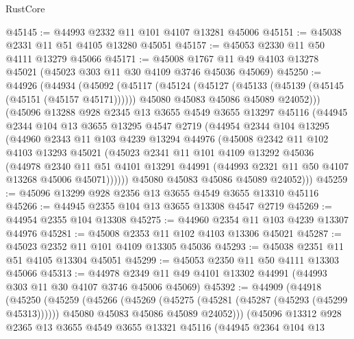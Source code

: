 \begin{lexlean}{RustCore}
\begin{coremodule}
@45145 := @44993 @2332 @11 @101 @4107 @13281 @45006
@45151 := @45038 @2331 @11 @51 @4105 @13280 @45051
@45157 := @45053 @2330 @11 @50 @4111 @13279 @45066
@45171 := @45008 @1767 @11 @49 @4103 @13278 @45021 (@45023 @303 @11 @30 @4109 @3746 @45036 @45069)
@45250 := @44926
    (@44934
      (@45092
        (@45117
          (@45124
            (@45127 (@45133 (@45139 (@45145 (@45151 (@45157 @45171))))))
            @45080
            @45083
            @45086
            @45089
            @24052)))
      (@45096
        @13288
        @928
        @2345
        @13
        @3655
        @4549
        @3655
        @13297
        @45116
        (@44945
          @2344
          @104
          @13
          @3655
          @13295
          @4547
          @2719
          (@44954
            @2344
            @104
            @13295
            (@44960
              @2343
              @11
              @103
              @4239
              @13294
              @44976
              (@45008
                @2342
                @11
                @102
                @4103
                @13293
                @45021
                (@45023
                  @2341
                  @11
                  @101
                  @4109
                  @13292
                  @45036
                  (@44978
                    @2340
                    @11
                    @51
                    @4101
                    @13291
                    @44991
                    (@44993 @2321 @11 @50 @4107 @13268 @45006 @45071))))))
          @45080
          @45083
          @45086
          @45089
          @24052)))
@45259 := @45096 @13299 @928 @2356 @13 @3655 @4549 @3655 @13310 @45116
@45266 := @44945 @2355 @104 @13 @3655 @13308 @4547 @2719
@45269 := @44954 @2355 @104 @13308
@45275 := @44960 @2354 @11 @103 @4239 @13307 @44976
@45281 := @45008 @2353 @11 @102 @4103 @13306 @45021
@45287 := @45023 @2352 @11 @101 @4109 @13305 @45036
@45293 := @45038 @2351 @11 @51 @4105 @13304 @45051
@45299 := @45053 @2350 @11 @50 @4111 @13303 @45066
@45313 := @44978 @2349 @11 @49 @4101 @13302 @44991 (@44993 @303 @11 @30 @4107 @3746 @45006 @45069)
@45392 := @44909
    (@44918
      (@45250
        (@45259
          (@45266
            (@45269 (@45275 (@45281 (@45287 (@45293 (@45299 @45313))))))
            @45080
            @45083
            @45086
            @45089
            @24052)))
      (@45096
        @13312
        @928
        @2365
        @13
        @3655
        @4549
        @3655
        @13321
        @45116
        (@44945
          @2364
          @104
          @13

\end{coremodule}
\end{lexlean}
